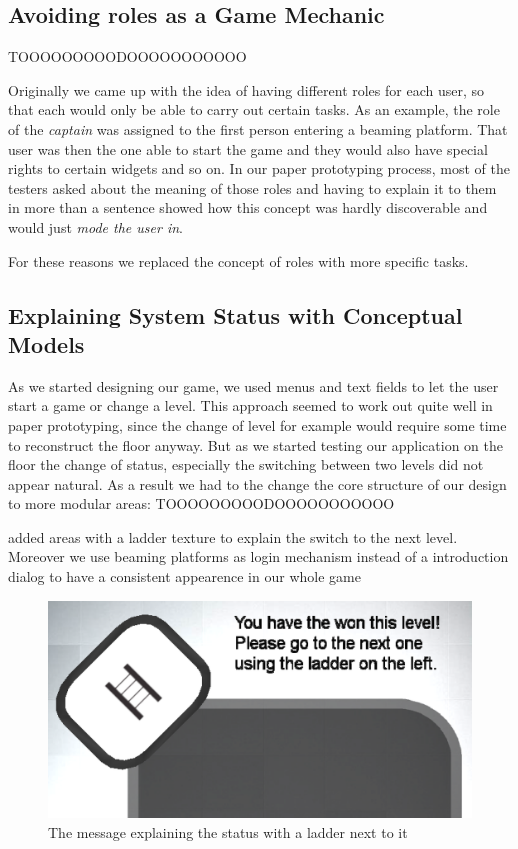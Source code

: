 \documentclass{sigchi}
\begin{document}
\subsection{Avoiding roles as a Game Mechanic}
\vspace{1mm}

TOOOOOOOOODOOOOOOOOOOO

Originally we came up with the idea of having different roles for each user, so that each would only be able to carry out certain tasks. As an example, the role of the \textit{captain} was assigned to the first person entering a beaming platform. That user was then the one able to start the game and they would also have special rights to certain widgets and so on. In our paper prototyping process, most of the testers asked about the meaning of those roles and having to explain it to them in more than a sentence showed how this concept was hardly discoverable and would just \textit{mode the user in}.

For these reasons we replaced the concept of roles with more specific tasks.

\subsection{Explaining System Status with Conceptual Models}
\vspace{1mm}
As we started designing our game, we used menus and text fields to let the user start a game or change a level. This approach seemed to work out quite well in paper prototyping, since the change of level for example would require some time to reconstruct the floor anyway. But as we started testing our application on the floor the change of status, especially the switching between two levels did not appear natural. As a result we had to the change the core structure of our design to more modular areas:
TOOOOOOOOODOOOOOOOOOOO

added areas with a ladder texture to explain the switch to the next level. Moreover we use beaming platforms as login mechanism instead of a introduction dialog to have a consistent appearence in our whole game

\begin{figure}[H]
\centering
\includegraphics[width=0.8\columnwidth]{ladder}
\caption{The message explaining the status with a ladder next to it}
\label{fig:gamingArea}
\end{figure}
\end{document}
